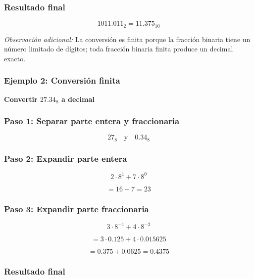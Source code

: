 \documentclass[12pt,twoside]{book}
\begin{document}
						\subsubsection*{Resultado final}
						
						\[
						1011.011_2 = 11.375_{10}
						\]
						
						\noindent
						\emph{Observación adicional:} La conversión es finita porque la fracción binaria tiene un número limitado de dígitos; toda fracción binaria finita produce un decimal exacto.
						
						\subsubsection*{Ejemplo 2: Conversión finita}
						
						\noindent
						\textbf{Convertir $27.34_8$ a decimal}
						
						\subsubsection*{Paso 1: Separar parte entera y fraccionaria}
						
						\[
						27_8 \quad \text{y} \quad 0.34_8
						\]
						
						\subsubsection*{Paso 2: Expandir parte entera}
						
						\[
						2\cdot8^1 + 7\cdot8^0
						\]
						
						\[
						= 16 + 7 = 23
						\]
						
						\subsubsection*{Paso 3: Expandir parte fraccionaria}
						
						\[
						3\cdot8^{-1} + 4\cdot8^{-2}
						\]
						
						\[
						= 3\cdot0.125 + 4\cdot0.015625
						\]
						
						\[
						= 0.375 + 0.0625 = 0.4375
						\]
						
						\subsubsection*{Resultado final}
						
\end{document}
